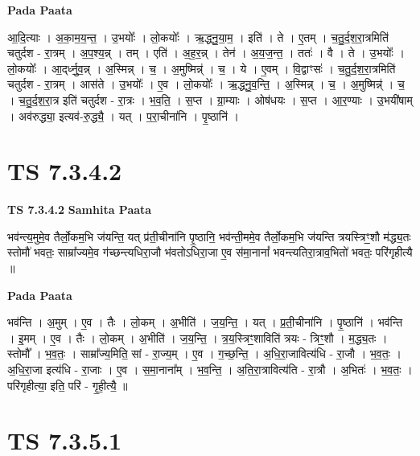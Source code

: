 \documentclass[17pt]{extarticle}
\begin{document}
\textbf{Pada Paata} \newline

आ॒दि॒त्याः । अ॒का॒म॒य॒न्त॒ । उ॒भयोः᳚ । लो॒कयोः᳚ । ऋ॒द्ध्नु॒या॒म॒ । इति॑ । ते । ए॒तम् । च॒तु॒र्द॒श॒रा॒त्रमिति॑ चतुर्दश - रा॒त्रम् । अ॒प॒श्य॒न्न् । तम् । एति॑ । अ॒ह॒र॒न्न् । तेन॑ । अ॒य॒ज॒न्त॒ । ततः॑ । वै । ते । उ॒भयोः᳚ । लो॒कयोः᳚ । आ॒द्‌र्ध्नु॒व॒न्न् । अ॒स्मिन्न् । च॒ । अ॒मुष्मिन्न्॑ । च॒ । ये । ए॒वम् । वि॒द्वाꣳसः॑ । च॒तु॒र्द॒श॒रा॒त्रमिति॑ चतुर्दश - रा॒त्रम् । आस॑ते । उ॒भयोः᳚ । ए॒व । लो॒कयोः᳚ । ऋ॒द्ध्नु॒व॒न्ति॒ । अ॒स्मिन्न् । च॒ । अ॒मुष्मिन्न्॑ । च॒ । च॒तु॒र्द॒श॒रा॒त्र इति॑ चतुर्दश - रा॒त्रः । भ॒व॒ति॒ । स॒प्त । ग्रा॒म्याः । ओष॑धयः । स॒प्त । आ॒र॒ण्याः । उ॒भयी॑षाम् । अव॑रुद्ध्या॒ इत्यव॑-रु॒द्ध्यै॒ । यत् । प॒रा॒चीना॑नि । पृ॒ष्ठानि॑ ।  \newline





\section{ TS 7.3.4.2 }

\textbf{TS 7.3.4.2 } \newline
\textbf{Samhita Paata} \newline

भव॑न्त्य॒मुमे॒व तैर्लो॒कम॒भि ज॑यन्ति॒ यत् प्र॑ती॒चीना॑नि पृ॒ष्ठानि॒ भव॑न्ती॒ममे॒व तैर्लो॒कम॒भि ज॑यन्ति त्रयस्त्रिꣳ॒॒शौ म॑द्ध्य॒तः स्तोमौ॑ भवतः॒ साम्रा᳚ज्यमे॒व ग॑च्छन्त्यधिरा॒जौ भ॑वतोऽधिरा॒जा ए॒व स॑मा॒नानां᳚ भवन्त्यतिरा॒त्राव॒भितो॑ भवतः॒ परि॑गृहीत्यै ॥ \newline

\textbf{Pada Paata} \newline

भव॑न्ति । अ॒मुम् । ए॒व । तैः । लो॒कम् । अ॒भीति॑ । ज॒य॒न्ति॒ । यत् । प्र॒ती॒चीना॑नि । पृ॒ष्ठानि॑ । भव॑न्ति । इ॒मम् । ए॒व । तैः । लो॒कम् । अ॒भीति॑ । ज॒य॒न्ति॒ । त्र॒य॒स्त्रिꣳ॒॒शाविति॑ त्रयः - त्रिꣳ॒॒शौ । म॒द्ध्य॒तः । स्तोमौ᳚ । भ॒व॒तः॒ । साम्रा᳚ज्य॒मिति॒ सां - रा॒ज्य॒म् । ए॒व । ग॒च्छ॒न्ति॒ । अ॒धि॒रा॒जावित्य॑धि - रा॒जौ । भ॒व॒तः॒ । अ॒धि॒रा॒जा इत्य॑धि - रा॒जाः । ए॒व । स॒मा॒नाना᳚म् । भ॒व॒न्ति॒ । अ॒ति॒रा॒त्रावित्य॑ति - रा॒त्रौ । अ॒भितः॑ । भ॒व॒तः॒ । परि॑गृहीत्या॒ इति॒ परि॑ - गृ॒ही॒त्यै॒ ॥  \newline





\section{ TS 7.3.5.1 }
\end{document}
